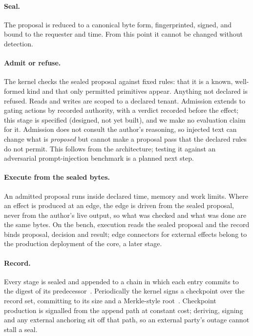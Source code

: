 \documentclass[11pt,a4paper]{article}
\begin{document}
\paragraph{Seal.} The proposal is reduced to a canonical byte form, fingerprinted, signed, and bound to the requester and time. From this point it cannot be changed without detection.

\paragraph{Admit or refuse.} The kernel checks the sealed proposal against fixed rules: that it is a known, well-formed kind and that only permitted primitives appear. Anything not declared is refused. Reads and writes are scoped to a declared tenant. Admission extends to gating actions by recorded authority, with a verdict recorded before the effect; this stage is specified (designed, not yet built), and we make no evaluation claim for it. Admission does not consult the author's reasoning, so injected text can change what is \emph{proposed} but cannot make a proposal pass that the declared rules do not permit. This follows from the architecture; testing it against an adversarial prompt-injection benchmark is a planned next step.

\paragraph{Execute from the sealed bytes.} An admitted proposal runs inside declared time, memory and work limits. Where an effect is produced at an edge, the edge is driven from the sealed proposal, never from the author's live output, so what was checked and what was done are the same bytes. On the bench, execution reads the sealed proposal and the record binds proposal, decision and result; edge connectors for external effects belong to the production deployment of the core, a later stage.

\paragraph{Record.} Every stage is sealed and appended to a chain in which each entry commits to the digest of its predecessor~\citep{schneier1999audit,crosby2009tamper}. Periodically the kernel signs a checkpoint over the record set, committing to its size and a Merkle-style root~\citep{merkle1987signature}. Checkpoint production is signalled from the append path at constant cost; deriving, signing and any external anchoring sit off that path, so an external party's outage cannot stall a seal.
\end{document}
